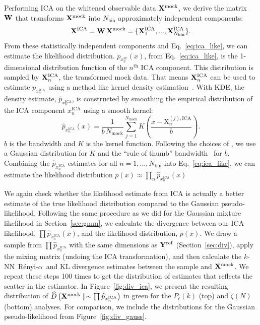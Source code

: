\documentclass[12pt, letterpaper, preprint]{aastex}
\newcommand{\Nd}{{100}\xspace}
\newcommand{\beq}{\begin{equation}}
\newcommand{\eeq}{\end{equation}}
\newcommand{\Xmock}{{\bf X}^\mathrm{mock}}
\newcommand{\Yref}{{\bf Y}^\mathrm{ref}}
\newcommand{\Ralpha}{R\'enyi-$\alpha$}
\newcommand{\ica}{{\small{ICA}}\xspace}
\begin{document}
Performing ICA on the whitened observable data $\Xmock$, we derive the 
matrix ${\bf W}$ that transforms $\Xmock$ into $N_\mathrm{bin}$
approximately independent components: 
\beq
{\bf X}^\mathrm{ICA} = {\bf W}\,\Xmock = \{{\bf X}^\mathrm{ICA}_1, ..., {\bf X}^\mathrm{ICA}_{N_\mathrm{bin}}\}.
\eeq
From these statistically independent components and Eq.~\ref{eq:ica_like}, 
we can estimate the likelihood distribution. $p_{x^\mathrm{IC}_n} (x)$, 
from Eq.~\ref{eq:ica_like}, is the 1-dimensional distribution 
function of the $n^\mathrm{th}$ ICA component. This distribution 
is sampled by ${\bf X}^\mathrm{ICA}_n$, the transformed mock data. 
That means ${\bf X}^\mathrm{ICA}_n$ can be used to estimate 
$p_{x^\mathrm{ICA}_n}$ using a method like kernel 
density estimation~\citep[KDE;][]{9780387848587,feigelson2012}. 
With KDE, the density estimate, $\widehat{p}_{x^\mathrm{ICA}_n}$, is constructed by 
smoothing the empirical distribution of the ICA component $x^\mathrm{ICA}_n$ 
using a smooth kernel: 
\beq
\widehat{p}_{x^\mathrm{ICA}_n}(x) = \frac{1}{b\,N_\mathrm{mock}} \sum\limits_{j=1}^{N_\mathrm{mock}} K \left( \frac{x - \mathrm{X}^{(j),\mathrm{ICA}}_n}{b} \right). 
\eeq
$b$ is the bandwidth and $K$ is the kernel function. Following the 
choices of \cite{hartlap2009}, we use a Gaussian distribution for $K$ and the 
``rule of thumb'' bandwidth~\cite[also known as Scott's rule;][]{scott1992,davison2008} 
for $b$. Combining the $\widehat{p}_{x^\mathrm{ICA}_n}$ estimates for 
all $n = 1, ..., N_\mathrm{bin}$ into Eq.~\ref{eq:ica_like}, we 
can estimate the likelihood distribution $p(x) \approx \prod\limits_n \widehat{p}_{x^\mathrm{ICA}_n}(x)$

We again check whether the likelihood estimate from \ica is actually 
a better estimate of the true likelihood distribution compared to the Gaussian 
pseudo-likelihood. Following the same procedure as we 
did for the Gaussian mixture likelihood in Section~\ref{sec:gmm}, we 
calculate the divergence between our ICA likelihood, $\prod \widehat{p}_{x^\mathrm{ICA}_n}(x)$, 
and the likelihood distribution, $p(x)$. We draw a sample from 
$\prod \widehat{p}_{x^\mathrm{ICA}_n}$ with the same dimensions as 
$\Yref$ (Section~\ref{sec:div}), apply the mixing matrix 
(undoing the \ica transformation), and then calculate the 
$k$-NN~\Ralpha~and KL divergence estimates between the sample and $\Xmock$. 
We repeat these steps \Nd times to get the distribution of estimates 
that reflects the scatter in the estimator. In Figure~\ref{fig:div_ica}, 
we present the resulting distribution of 
$\widehat{D}\left(\Xmock \parallel \sim \prod \widehat{p}_{x^\mathrm{ICA}_n} \right)$
in green for the $P_\ell(k)$ (top) and $\zeta(N)$ (bottom) analyses. 
For comparison, we include the distributions for the Gaussian pseudo-likelihood
from Figure~\ref{fig:div_gauss}. 
\end{document}
